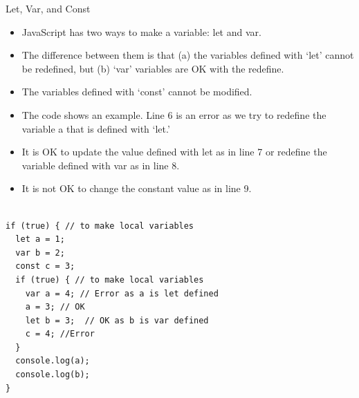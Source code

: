 \begin{frame}[fragile]{Let, Var, and Const}

\begin{itemize}
	\item JavaScript has two ways to make a variable: let and var. 
	\item The difference between them is that (a) the variables defined with `let' cannot be redefined, but (b) `var' variables are OK with the redefine. 
    \item The variables defined with `const' cannot be modified. 
\end{itemize}

\end{frame}

\begin{frame}[fragile]{}

\begin{itemize}
	\item The code shows an example. Line 6 is an error as we try to redefine the variable a that is defined with `let.' 
	\item It is OK to update the value defined with let as in line 7 or redefine the variable defined with var as in line 8. 
	\item It is not OK to change the constant value as in line 9. 
\end{itemize}

\begin{Code}{}%
\begin{lstlisting}[firstnumber=1, label=glabels, xleftmargin=0pt, basicstyle=\tiny]% 

if (true) { // to make local variables
  let a = 1; 
  var b = 2;
  const c = 3;
  if (true) { // to make local variables
    var a = 4; // Error as a is let defined
    a = 3; // OK 
    let b = 3;  // OK as b is var defined
    c = 4; //Error 
  }
  console.log(a); 
  console.log(b);
}
\end{lstlisting}%
\end{Code}
\end{frame}

